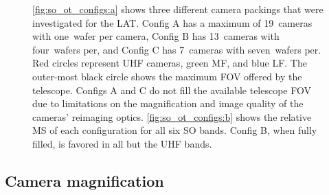 \begin{figure}[!t]
    \caption[Sensitivity comparison between candidate SO LAT configurations]{\ref{fig:so_ot_configs:a} shows three different camera packings that were investigated for the LAT. Config A has a maximum of 19~cameras with one~wafer per camera, Config B has 13~cameras with four~wafers per, and Config C has 7~cameras with seven~wafers per. Red circles represent UHF cameras, green MF, and blue LF. The outer-most black circle shows the maximum FOV offered by the telescope. Configs A and C do not fill the available telescope FOV due to limitations on the magnification and image quality of the cameras' reimaging optics. \ref{fig:so_ot_configs:b} shows the relative MS of each configuration for all six SO bands. Config B, when fully filled, is favored in all but the UHF bands.}
    \label{fig:so_ot_configs}
\end{figure}


\subsection{Camera magnification}
\label{sec:bolocalc_camera_magnification}

